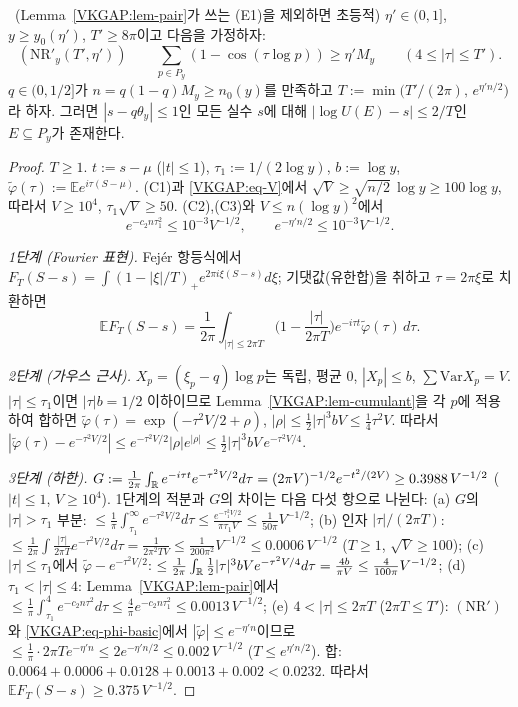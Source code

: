 \begin{proposition}\label{VKGAP:prop-core}
\PROVED\ (Lemma~\ref{VKGAP:lem-pair}가 쓰는 (E1)을 제외하면 초등적)
$\eta'\in(0,1]$, $y\ge y_0(\eta')$, $T'\ge8\pi$이고 다음을 가정하자:
\[
(\mathrm{NR}'_y(T',\eta'))\qquad \sum_{p\in P_y}(1-\cos(\tau\log p))\ge\eta'M_y\qquad(4\le|\tau|\le T').
\]
$q\in(0,1/2]$가 $n=q(1-q)M_y\ge n_0(y)$를 만족하고 $T:=\min\big(T'/(2\pi),\,e^{\eta'n/2}\big)$라 하자. 그러면
$|s-q\theta_y|\le1$인 모든 실수 $s$에 대해 $|\log U(E)-s|\le2/T$인 $E\subseteq P_y$가 존재한다.
\end{proposition}
\begin{proof}
$T\ge1$. $t:=s-\mu$ ($|t|\le1$), $\tau_1:=1/(2\log y)$, $b:=\log y$, $\tilde\varphi(\tau):=\mathbb{E}e^{i\tau(S-\mu)}$.
(C1)과 \eqref{VKGAP:eq-V}에서 $\sqrt V\ge\sqrt{n/2}\,\log y\ge100\log y$, 따라서 $V\ge10^4$, $\tau_1\sqrt V\ge50$.
(C2),(C3)와 $V\le n(\log y)^2$에서
\begin{equation}\label{VKGAP:eq-C23}
e^{-c_2n\tau_1^2}\le10^{-3}V^{-1/2},\qquad e^{-\eta'n/2}\le10^{-3}V^{-1/2}.
\end{equation}

\emph{1단계 (Fourier 표현).} Fejér 항등식에서 $F_T(S-s)=\int(1-|\xi|/T)_+e^{2\pi i\xi(S-s)}d\xi$; 기댓값(유한합)을 취하고 $\tau=2\pi\xi$로 치환하면
\[
\mathbb{E}F_T(S-s)=\frac1{2\pi}\int_{|\tau|\le2\pi T}\Big(1-\frac{|\tau|}{2\pi T}\Big)e^{-i\tau t}\tilde\varphi(\tau)\,d\tau .
\]

\emph{2단계 (가우스 근사).} $X_p=(\xi_p-q)\log p$는 독립, 평균 $0$, $|X_p|\le b$, $\sum\mathrm{Var}X_p=V$.
$|\tau|\le\tau_1$이면 $|\tau|b=1/2$ 이하이므로 Lemma~\ref{VKGAP:lem-cumulant}을 각 $p$에 적용하여 합하면
$\tilde\varphi(\tau)=\exp(-\tau^2V/2+\rho)$, $|\rho|\le\frac12|\tau|^3bV\le\frac14\tau^2V$. 따라서
$|\tilde\varphi(\tau)-e^{-\tau^2V/2}|\le e^{-\tau^2V/2}|\rho|e^{|\rho|}\le\frac12|\tau|^3bV\,e^{-\tau^2V/4}$.

\emph{3단계 (하한).} $G:=\frac1{2\pi}\int_{\mathbb{R}} e^{-i\tau t}e^{-\tau^2V/2}d\tau=(2\pi V)^{-1/2}e^{-t^2/(2V)}\ge0.3988\,V^{-1/2}$ ($|t|\le1$, $V\ge10^4$).
1단계의 적분과 $G$의 차이는 다음 다섯 항으로 나뉜다:
(a) $G$의 $|\tau|>\tau_1$ 부분: $\le\frac1\pi\int_{\tau_1}^\infty e^{-\tau^2V/2}d\tau\le\frac{e^{-\tau_1^2V/2}}{\pi\tau_1V}\le\frac{1}{50\pi}V^{-1/2}$;
(b) 인자 $|\tau|/(2\pi T)$: $\le\frac1{2\pi}\int\frac{|\tau|}{2\pi T}e^{-\tau^2V/2}d\tau=\frac1{2\pi^2TV}\le\frac{1}{200\pi^2}V^{-1/2}\le0.0006\,V^{-1/2}$ ($T\ge1$, $\sqrt V\ge100$);
(c) $|\tau|\le\tau_1$에서 $\tilde\varphi-e^{-\tau^2V/2}$: $\le\frac1{2\pi}\int_{\mathbb{R}}\frac12|\tau|^3bVe^{-\tau^2V/4}d\tau=\frac{4b}{\pi V}\le\frac{4}{100\pi}V^{-1/2}$;
(d) $\tau_1<|\tau|\le4$: Lemma~\ref{VKGAP:lem-pair}에서 $\le\frac1\pi\int_{\tau_1}^4e^{-c_2n\tau^2}d\tau\le\frac4\pi e^{-c_2n\tau_1^2}\le0.0013\,V^{-1/2}$;
(e) $4<|\tau|\le2\pi T$ ($2\pi T\le T'$): $(\mathrm{NR}')$와 \eqref{VKGAP:eq-phi-basic}에서 $|\tilde\varphi|\le e^{-\eta'n}$이므로
$\le\frac1\pi\cdot2\pi T e^{-\eta'n}\le2e^{-\eta'n/2}\le0.002\,V^{-1/2}$ ($T\le e^{\eta'n/2}$).
합: $0.0064+0.0006+0.0128+0.0013+0.002<0.0232$. 따라서 $\mathbb{E}F_T(S-s)\ge0.375\,V^{-1/2}$.


\end{proof}
